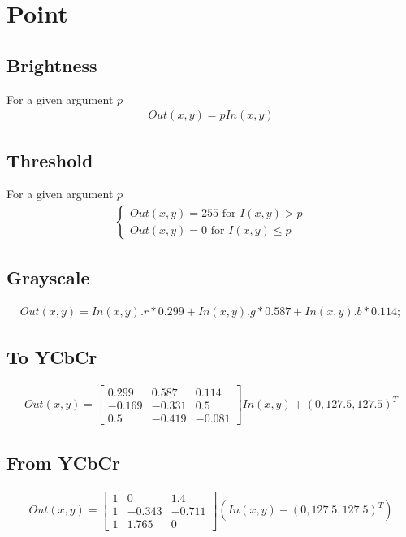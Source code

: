 \documentclass{article}
\begin{document}
\section{Point}
\subsection{Brightness}
For a given argument $p$
\begin{gather*}
    Out(x,y) = pIn(x,y)
\end{gather*}
\subsection{Threshold}
For a given argument $p$
\begin{gather*}
    \begin{cases}
        Out(x,y) = 255 \text{      for $I(x,y) > p$} \\
        Out(x,y) = 0   \text{      for $I(x,y) \le p$}
    \end{cases}
\end{gather*}
\subsection{Grayscale}
\begin{gather*}
    Out(x,y) = In(x,y).r * 0.299 + In(x,y).g * 0.587 + In(x,y).b * 0.114;
\end{gather*}
\subsection{To YCbCr}
\begin{gather*}
    Out(x,y) = \begin{bmatrix} 
    0.299 & 0.587 & 0.114 \\ 
    -0.169 & -0.331 & 0.5 \\ 
    0.5 & -0.419 & -0.081
    \end{bmatrix} In(x,y) + (0, 127.5, 127.5)^T
\end{gather*}
\subsection{From YCbCr}
\begin{gather*}
    Out(x,y) = \begin{bmatrix} 
    1 & 0 & 1.4 \\ 
    1 & -0.343 & -0.711 \\ 
    1 & 1.765 & 0
    \end{bmatrix} (In(x,y) - (0, 127.5, 127.5)^T)
\end{gather*}
\end{document}
